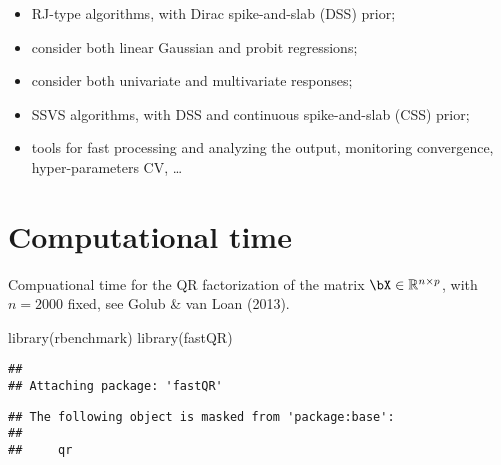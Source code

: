 \documentclass[]{tufte-handout}
\newenvironment{Shaded}{}{}
\newcommand{\FunctionTok}[1]{\textcolor[rgb]{0.02,0.16,0.49}{#1}}
\newcommand{\NormalTok}[1]{#1}
\providecommand{\tightlist}{%
  \setlength{\itemsep}{0pt}\setlength{\parskip}{0pt}}
\begin{document}
\begin{itemize}
\tightlist
\item
  RJ-type algorithms, with Dirac spike-and-slab (DSS) prior;
\item
  consider both linear Gaussian and probit regressions;
\item
  consider both univariate and multivariate responses;
\item
  SSVS algorithms, with DSS and continuous spike-and-slab (CSS) prior;
\item
  tools for fast processing and analyzing the output, monitoring
  convergence, hyper-parameters CV, \ldots
\end{itemize}

\hypertarget{computational-time}{%
\section{Computational time}\label{computational-time}}

Compuational time for the QR factorization of the matrix
\(\bX\in\mathbb{R}^{n\times p}\), with \(n=2000\) fixed, see Golub \&
van Loan (2013).

\begin{Shaded}
\begin{Highlighting}[]
\FunctionTok{library}\NormalTok{(rbenchmark)}
\FunctionTok{library}\NormalTok{(fastQR)}
\end{Highlighting}
\end{Shaded}

\begin{verbatim}
## 
## Attaching package: 'fastQR'
\end{verbatim}

\begin{verbatim}
## The following object is masked from 'package:base':
## 
##     qr
\end{verbatim}
\end{document}
